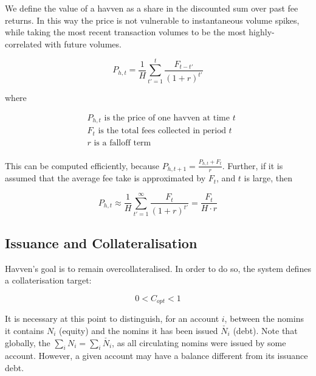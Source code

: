 \noindent We define the value of a havven as a share in the discounted sum over past fee returns.
In this way the price is not vulnerable to instantaneous volume spikes, while
taking the most recent transaction volumes to be the most highly-correlated with future volumes.

\begin{equation}
    P_{h,t} = \frac{1}{H} \sum_{t'=1}^{t} \frac{F_{t - t'}}{(1 + r)^{t'}} \label{eq:price}
\end{equation}

where

\begin{align*} 
& P_{h,t} \text{ is the price of one havven at time } t  \\
& F_t \text{ is the total fees collected in period } t\\
& r \text{ is a falloff term}  \\
\end{align*}

\noindent This can be computed efficiently, because $P_{h,t+1} = \frac{P_{h,t} + F_t}{r}$. 
Further, if it is assumed that the average fee take is approximated by $F_t$, and $t$ is large, then

\begin{equation}
    P_{h,t} \approx \frac{1}{H} \sum_{t'=1}^{\infty} \frac{F_t}{(1 + r)^{t'}} = \frac{F_t}{H \cdot r}
\end{equation}

\newpage

\subsection{Issuance and Collateralisation} 


\noindent Havven's goal is to remain overcollateralised. In order to do so, the system defines a collaterisation target:

\begin{equation}
0 < C_{opt} < 1  \label{eq:target}
\end{equation}

\noindent It is necessary at this point to distinguish, for an account $i$, between the nomins it contains $N_i$ (equity) and the nomins it has been issued $\check{N_i}$ (debt). Note that globally, the $\sum_{i}N_i = \sum_{i}\check{N_i}$, as all circulating nomins were issued by some account. However, a given account may have a balance different from its issuance debt.\\

